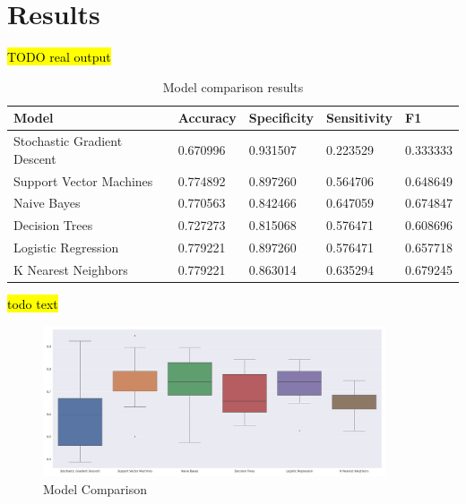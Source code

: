 \documentclass[11pt]{article}
\renewcommand{\arraystretch}{1.3}
\begin{document}
	\section{Results}
		\hl{TODO real output}
		\begin{table}[H]
			\renewcommand{\arraystretch}{1.3}
			\begin{tabularx}{\linewidth}{lXXXX}
				Model & Accuracy & Specificity & Sensitivity & F1 \\
				\toprule
				Stochastic Gradient Descent  &  0.670996  &  0.931507  &  0.223529  &  0.333333  \\
				Support Vector Machines  &  0.774892  &  0.897260  &  0.564706  &  0.648649  \\
				Naive Bayes  &  0.770563  &  0.842466  &  0.647059  &  0.674847  \\
				Decision Trees  &  0.727273  &  0.815068  &  0.576471  &  0.608696  \\
				Logistic Regression  &  0.779221  &  0.897260  &  0.576471  &  0.657718  \\
				K Nearest Neighbors  &  0.779221  &  0.863014  &  0.635294  &  0.679245  \\
			\end{tabularx}
			\caption{Model comparison results}
			\label{fig:results}
		\end{table}
		\hl{todo text}
		\begin{figure}[H]
			\centering
			\includegraphics[width=0.9\textwidth]{img/model_comparision.pdf}
			\caption{Model Comparison}	
		\end{figure}

\end{document}
